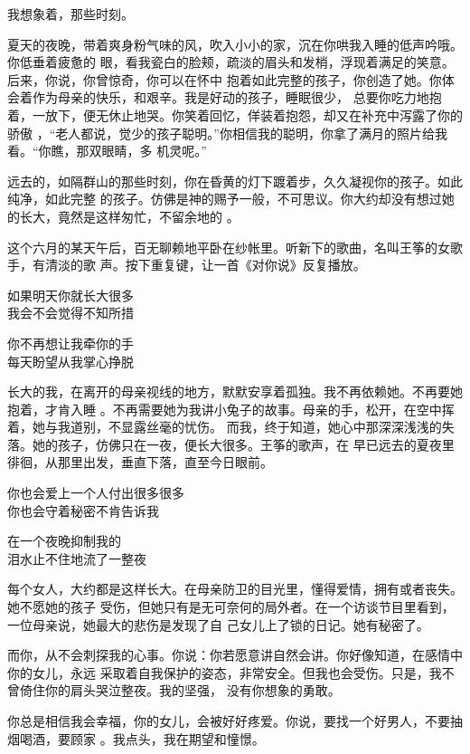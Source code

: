 \documentclass[12pt,a4paper]{article}
\begin{document}
		我想象着，那些时刻。

		夏天的夜晚，带着爽身粉气味的风，吹入小小的家，沉在你哄我入睡的低声吟哦。你低垂着疲惫的
	眼，看我瓷白的脸颊，疏淡的眉头和发梢，浮现着满足的笑意。后来，你说，你曾惊奇，你可以在怀中
	抱着如此完整的孩子，你创造了她。你体会着作为母亲的快乐，和艰辛。我是好动的孩子，睡眠很少，
	总要你吃力地抱着，一放下，便无休止地哭。你笑着回忆，佯装着抱怨，却又在补充中泻露了你的骄傲
	，“老人都说，觉少的孩子聪明。”你相信我的聪明，你拿了满月的照片给我看。“你瞧，那双眼睛，多
	机灵呢。”

		远去的，如隔群山的那些时刻，你在昏黄的灯下踱着步，久久凝视你的孩子。如此纯净，如此完整
	的孩子。仿佛是神的赐予一般，不可思议。你大约却没有想过她的长大，竟然是这样匆忙，不留余地的
	。

		这个六月的某天午后，百无聊赖地平卧在纱帐里。听新下的歌曲，名叫王筝的女歌手，有清淡的歌
	声。按下重复键，让一首《对你说》反复播放。

		\longpoem{}{}{}
		如果明天你就长大很多 \\
		我会不会觉得不知所措

		你不再想让我牵你的手 \\
		每天盼望从我掌心挣脱
		\endlongpoem

		长大的我，在离开的母亲视线的地方，默默安享着孤独。我不再依赖她。不再要她抱着，才肯入睡
	。不再需要她为我讲小兔子的故事。母亲的手，松开，在空中挥着，她与我道别，不显露丝毫的忧伤。
	而我，终于知道，她心中那深深浅浅的失落。她的孩子，仿佛只在一夜，便长大很多。王筝的歌声，在
	早已远去的夏夜里徘徊，从那里出发，垂直下落，直至今日眼前。

		\longpoem{}{}{}
		你也会爱上一个人付出很多很多 \\
		你也会守着秘密不肯告诉我

		在一个夜晚抑制我的 \\
		泪水止不住地流了一整夜
		\endlongpoem

		每个女人，大约都是这样长大。在母亲防卫的目光里，懂得爱情，拥有或者丧失。她不愿她的孩子
	受伤，但她只有是无可奈何的局外者。在一个访谈节目里看到，一位母亲说，她最大的悲伤是发现了自
	己女儿上了锁的日记。她有秘密了。

		而你，从不会刺探我的心事。你说：你若愿意讲自然会讲。你好像知道，在感情中你的女儿，永远
	采取着自我保护的姿态，非常安全。但我也会受伤。只是，我不曾倚住你的肩头哭泣整夜。我的坚强，
	没有你想象的勇敢。

		你总是相信我会幸福，你的女儿，会被好好疼爱。你说，要找一个好男人，不要抽烟喝酒，要顾家
	。我点头，我在期望和憧憬。
\end{document}
